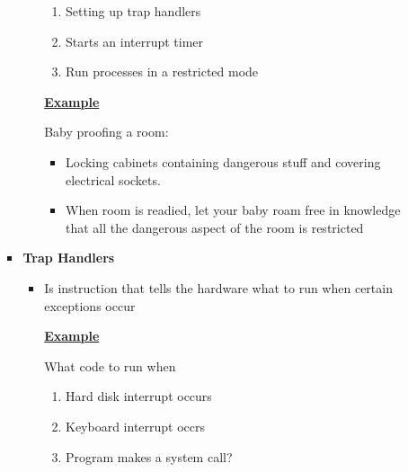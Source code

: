 \documentclass[12pt]{article}
\begin{document}
\begin{enumerate}[1.]
\begin{enumerate}[a)]
\begin{itemize}
\begin{itemize}
                \bigskip

                \begin{enumerate}[1.]
                    \item Setting up trap handlers
                    \item Starts an interrupt timer
                    \item Run processes in a restricted mode
                \end{enumerate}

                \bigskip

                \underline{\textbf{Example}}

                \bigskip

                Baby proofing a room:

                \bigskip

                \begin{itemize}
                    \item Locking cabinets containing dangerous stuff and covering electrical sockets.
                    \item When room is readied, let your baby roam free in knowledge that all the dangerous
                    aspect of the room is restricted
                \end{itemize}
            \end{itemize}

            \item \textbf{Trap Handlers}

            \begin{itemize}
                \item Is instruction that tells the hardware what to run when certain exceptions occur

                \bigskip

                \underline{\textbf{Example}}

                \bigskip

                What code to run when

                \begin{enumerate}[1.]
                    \item Hard disk interrupt occurs
                    \item Keyboard interrupt occrs
                    \item Program makes a system call?
                \end{enumerate}


\end{itemize}
\end{itemize}
\end{enumerate}
\end{enumerate}
\end{document}
